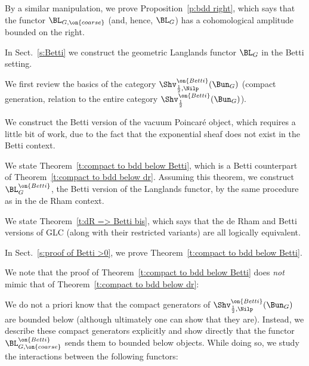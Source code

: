 \documentclass[9pt]{amsart}
\theoremstyle{remark}
\theoremstyle{definition}
\theoremstyle{remark}
\newcommand{\thmref}[1]{Theorem~\ref{#1}}
\newcommand{\secref}[1]{Sect.~\ref{#1}}
\newcommand{\propref}[1]{Proposition~\ref{#1}}
\numberwithin{equation}{section}
\begin{document}
\medskip

By a similar manipulation, we prove \propref{p:bdd right}, which says that the functor $\BL_{G,\on{coarse}}$ (and, hence, $\BL_G$)
has a cohomological amplitude bounded on the right. 

\sssec{}

In \secref{s:Betti} we construct the geometric Langlands functor $\BL_G$ in the Betti setting.

\medskip

We first review the basics of the category $\Shv^{\on{Betti}}_{\frac{1}{2},\Nilp}(\Bun_G)$
(compact generation, relation to the entire category $\Shv^{\on{Betti}}_{\frac{1}{2}}(\Bun_G)$).

\medskip

We construct the Betti version of the vacuum Poincar\'e object, which requires a little bit of work,
due to the fact that the exponential sheaf does not exist in the Betti context.

\medskip

We state \thmref{t:compact to bdd below Betti}, which is a Betti counterpart of \thmref{t:compact to bdd below dr}.
Assuming this theorem, we construct $\BL_G^{\on{Betti}}$, the Betti version of the Langlands functor, by the
same procedure as in the de Rham context.

\medskip

We state \thmref{t:dR => Betti bis}, which says that the de Rham and Betti versions of GLC (along with their
restricted variants) are all logically equivalent.

\sssec{}

In \secref{s:proof of Betti >0}, we prove \thmref{t:compact to bdd below Betti}. 

\medskip

We note that the proof of \thmref{t:compact to bdd below Betti} does \emph{not} mimic that of 
\thmref{t:compact to bdd below dr}:

\medskip

We do not a priori know that the compact generators of 
$\Shv^{\on{Betti}}_{\frac{1}{2},\Nilp}(\Bun_G)$ are bounded below (although ultimately one can show that they are). 
Instead, we describe these compact generators explicitly and show directly that the functor 
$\BL_{G,\on{coarse}}^{\on{Betti}}$ sends them to bounded below objects. While doing so,
we study the interactions between the following functors:

\smallskip
\end{document}
